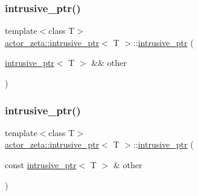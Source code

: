 \subsubsection{\texorpdfstring{intrusive\+\_\+ptr()}{intrusive\_ptr()}\hspace{0.1cm}{\footnotesize\ttfamily [3/5]}}
{\footnotesize\ttfamily template$<$class T$>$ \\
\hyperlink{classactor__zeta_1_1intrusive__ptr}{actor\+\_\+zeta\+::intrusive\+\_\+ptr}$<$ T $>$\+::\hyperlink{classactor__zeta_1_1intrusive__ptr}{intrusive\+\_\+ptr} (\begin{DoxyParamCaption}\item[{\hyperlink{classactor__zeta_1_1intrusive__ptr}{intrusive\+\_\+ptr}$<$ T $>$ \&\&}]{other }\end{DoxyParamCaption})\hspace{0.3cm}{\ttfamily [inline]}}

\mbox{\label{classactor__zeta_1_1intrusive__ptr_a254d4ebf6a898bddceac94f5d2a3de4e}} 
\subsubsection{\texorpdfstring{intrusive\+\_\+ptr()}{intrusive\_ptr()}\hspace{0.1cm}{\footnotesize\ttfamily [4/5]}}
{\footnotesize\ttfamily template$<$class T$>$ \\
\hyperlink{classactor__zeta_1_1intrusive__ptr}{actor\+\_\+zeta\+::intrusive\+\_\+ptr}$<$ T $>$\+::\hyperlink{classactor__zeta_1_1intrusive__ptr}{intrusive\+\_\+ptr} (\begin{DoxyParamCaption}\item[{const \hyperlink{classactor__zeta_1_1intrusive__ptr}{intrusive\+\_\+ptr}$<$ T $>$ \&}]{other }\end{DoxyParamCaption})\hspace{0.3cm}{\ttfamily [inline]}}

\mbox{\label{classactor__zeta_1_1intrusive__ptr_acc5aad05327df8f0a41ea40fed0bc41b}} 
